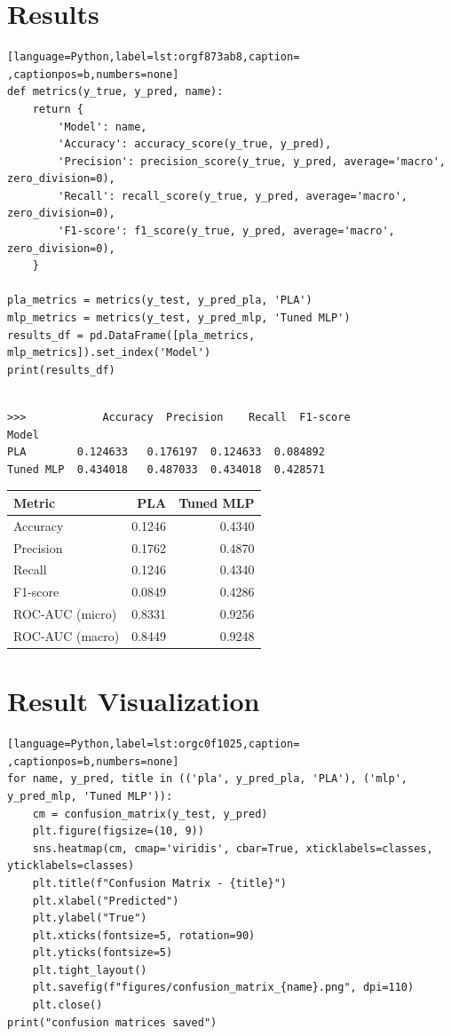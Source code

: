 \documentclass[11pt]{article}
\begin{document}
\section{Results}
\label{sec:org29449a8}

\begin{lstlisting}[language=Python,label=lst:orgf873ab8,caption= ,captionpos=b,numbers=none]
def metrics(y_true, y_pred, name):
    return {
        'Model': name,
        'Accuracy': accuracy_score(y_true, y_pred),
        'Precision': precision_score(y_true, y_pred, average='macro', zero_division=0),
        'Recall': recall_score(y_true, y_pred, average='macro', zero_division=0),
        'F1-score': f1_score(y_true, y_pred, average='macro', zero_division=0),
    }

pla_metrics = metrics(y_test, y_pred_pla, 'PLA')
mlp_metrics = metrics(y_test, y_pred_mlp, 'Tuned MLP')
results_df = pd.DataFrame([pla_metrics, mlp_metrics]).set_index('Model')
print(results_df)
\end{lstlisting}

\begin{verbatim}

>>>            Accuracy  Precision    Recall  F1-score
Model                                             
PLA        0.124633   0.176197  0.124633  0.084892
Tuned MLP  0.434018   0.487033  0.434018  0.428571
\end{verbatim}


\begin{center}
\begin{tabular}{lrr}
\hline
Metric & PLA & Tuned MLP\\[0pt]
\hline
Accuracy & 0.1246 & 0.4340\\[0pt]
Precision & 0.1762 & 0.4870\\[0pt]
Recall & 0.1246 & 0.4340\\[0pt]
F1-score & 0.0849 & 0.4286\\[0pt]
ROC-AUC (micro) & 0.8331 & 0.9256\\[0pt]
ROC-AUC (macro) & 0.8449 & 0.9248\\[0pt]
\hline
\end{tabular}
\end{center}

\section{Result Visualization}
\label{sec:org76a0e07}

\begin{lstlisting}[language=Python,label=lst:orgc0f1025,caption= ,captionpos=b,numbers=none]
for name, y_pred, title in (('pla', y_pred_pla, 'PLA'), ('mlp', y_pred_mlp, 'Tuned MLP')):
    cm = confusion_matrix(y_test, y_pred)
    plt.figure(figsize=(10, 9))
    sns.heatmap(cm, cmap='viridis', cbar=True, xticklabels=classes, yticklabels=classes)
    plt.title(f"Confusion Matrix - {title}")
    plt.xlabel("Predicted")
    plt.ylabel("True")
    plt.xticks(fontsize=5, rotation=90)
    plt.yticks(fontsize=5)
    plt.tight_layout()
    plt.savefig(f"figures/confusion_matrix_{name}.png", dpi=110)
    plt.close()
print("confusion matrices saved")
\end{lstlisting}
\end{document}

